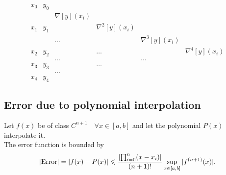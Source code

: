 \documentclass{report}
\begin{document}
\[
	\begin{array}{cccccc}
		x_0 & y_0                                                                           \\
		    &     & \nabla[y](x_i)                                                          \\
		x_1 & y_1 &                & \nabla^2[y](x_i)                                       \\
		    &     & \dots          &                  & \nabla^3[y](x_i)                    \\
		x_2 & y_2 &                & \dots            &                  & \nabla^4[y](x_i) \\
		    &     & \dots          &                  & \dots                               \\
		x_3 & y_3 &                & \dots                                                  \\
		    &     & \dots                                                                   \\
		x_4 & y_4
	\end{array}
\]

\subsection{Error due to polynomial interpolation}

Let $f(x)$ be of class $C^{n+1} \quad \forall x \in [a,b]$ and let the polynomial $P(x)$ interpolate it. \\

The error function is bounded by
\[
	|\text{Error}| = |f(x) - P(x)| \leqslant \frac{\left| \prod_{i=0}^n (x-x_i) \right|}{(n+1)!} \sup_{x\in[a,b]} |f^{(n+1)}(x)|
	.\]
\end{document}
